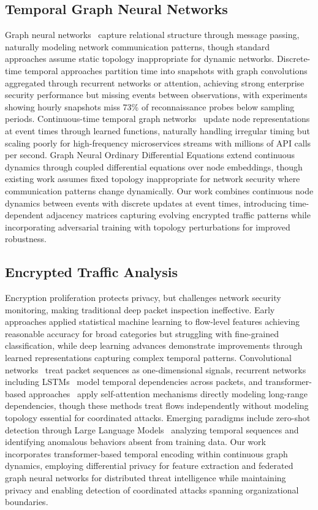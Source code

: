 \documentclass[lettersize,journal]{IEEEtran}
\begin{document}
\subsection{Temporal Graph Neural Networks}

Graph neural networks~\cite{kipf2017semi} capture relational structure through message passing, naturally modeling network communication patterns, though standard approaches assume static topology inappropriate for dynamic networks. Discrete-time temporal approaches partition time into snapshots with graph convolutions aggregated through recurrent networks or attention, achieving strong enterprise security performance but missing events between observations, with experiments showing hourly snapshots miss 73\% of reconnaissance probes below sampling periods. Continuous-time temporal graph networks~\cite{rossi2020temporal} update node representations at event times through learned functions, naturally handling irregular timing but scaling poorly for high-frequency microservices streams with millions of API calls per second. Graph Neural Ordinary Differential Equations extend continuous dynamics through coupled differential equations over node embeddings, though existing work assumes fixed topology inappropriate for network security where communication patterns change dynamically. Our work combines continuous node dynamics between events with discrete updates at event times, introducing time-dependent adjacency matrices capturing evolving encrypted traffic patterns while incorporating adversarial training with topology perturbations for improved robustness.

\subsection{Encrypted Traffic Analysis}

Encryption proliferation protects privacy, but challenges network security monitoring, making traditional deep packet inspection ineffective. Early approaches applied statistical machine learning to flow-level features achieving reasonable accuracy for broad categories but struggling with fine-grained classification, while deep learning advances demonstrate improvements through learned representations capturing complex temporal patterns. Convolutional networks~\cite{vinayakumar2017applying} treat packet sequences as one-dimensional signals, recurrent networks including LSTMs~\cite{kim2016lstm} model temporal dependencies across packets, and transformer-based approaches~\cite{jiang2020transformer} apply self-attention mechanisms directly modeling long-range dependencies, though these methods treat flows independently without modeling topology essential for coordinated attacks. Emerging paradigms include zero-shot detection through Large Language Models~\cite{zeng2024tpp,wei2022chain} analyzing temporal sequences and identifying anomalous behaviors absent from training data. Our work incorporates transformer-based temporal encoding within continuous graph dynamics, employing differential privacy for feature extraction and federated graph neural networks for distributed threat intelligence while maintaining privacy and enabling detection of coordinated attacks spanning organizational boundaries.
\end{document}
